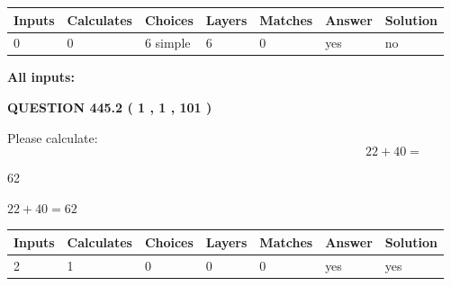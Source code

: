 \documentclass[12pt]{article}
\begin{document}
 
   
   
   
   
\noindent\begin{tabular}{|l|l|l|l|l|l|l|}
 \hline
Inputs & Calculates & Choices & Layers & Matches & Answer & Solution \\ \hline
 0  & 
 0  & 
 6
  simple  
  & 
 6  & 
 0  & 
  yes & 
  no 
  \\ \hline
 \end{tabular}
   
   
   
   
\noindent{}
   
   
   
   
\noindent\vspace{0.1in}\hspace{-0.08in} {\textbf{\Large{All inputs: }}}
   
   
  
\vspace{0.2in}
  
{\textbf{\Large{QUESTION
445.2 
 ( 1 , 1 , 101 )
}}}
  
  
 
Please calculate:
\begin{equation}
22 +  %
40 = \nonumber
\end{equation}
 
 
 
\noindent{}
 
 

62
 
 
\noindent{}
 
 

 
 
 
\noindent{}
 
 

$ %
22 +  %
40=   %
62$
 
 
\noindent{}
 
 

 
   
   
   
   
\noindent\begin{tabular}{|l|l|l|l|l|l|l|}
 \hline
Inputs & Calculates & Choices & Layers & Matches & Answer & Solution \\ \hline
 2  & 
 1  & 
 0
  & 
 0  & 
 0  & 
  yes & 
  yes 
  \\ \hline
 \end{tabular}
   
\end{document}

